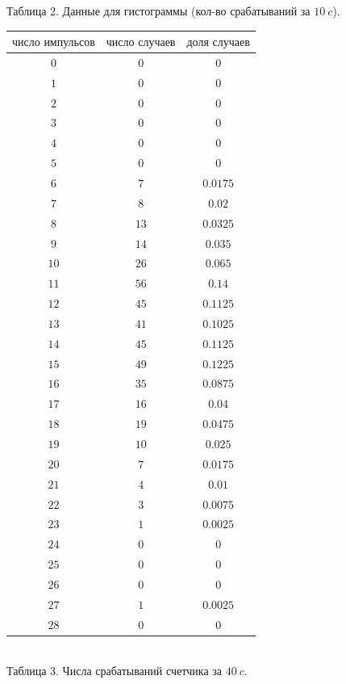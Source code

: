 \documentclass[a4paper,12pt]{article} %
\begin{document}
Таблица 2. Данные для гистограммы (кол-во срабатываний за $10\ c$).

\begin{tabular}{ | c | c | c |}
\hline
$\textbf{число импульсов}$ & $\textbf{число случаев}$ & $\textbf{доля случаев}$\\ \hline
$0$ & $0$ & $0$\\ \hline
$1$ & $0$ & $0$\\ \hline
$2$ & $0$ & $0$\\ \hline
$3$ & $0$ & $0$\\ \hline
$4$ & $0$ & $0$\\ \hline
$5$ & $0$ & $0$\\ \hline
$6$ & $7$ & $0.0175$\\ \hline
$7$ & $8$ & $0.02$\\ \hline
$8$ & $13$ & $0.0325$\\ \hline
$9$ & $14$ & $0.035$\\ \hline
$10$ & $26$ & $0.065$\\ \hline
$11$ & $56$ & $0.14$\\ \hline
$12$ & $45$ & $0.1125$\\ \hline
$13$ & $41$ & $0.1025$\\ \hline
$14$ & $45$ & $0.1125$\\ \hline
$15$ & $49$ & $0.1225$\\ \hline
$16$ & $35$ & $0.0875$\\ \hline
$17$ & $16$ & $0.04$\\ \hline
$18$ & $19$ & $0.0475$\\ \hline
$19$ & $10$ & $0.025$\\ \hline
$20$ & $7$ & $0.0175$\\ \hline
$21$ & $4$ & $0.01$\\ \hline
$22$ & $3$ & $0.0075$\\ \hline
$23$ & $1$ & $0.0025$\\ \hline
$24$ & $0$ & $0$\\ \hline
$25$ & $0$ & $0$\\ \hline
$26$ & $0$ & $0$\\ \hline
$27$ & $1$ & $0.0025$\\ \hline
$28$ & $0$ & $0$\\
\hline 
\end{tabular}\\

\newpage
Таблица 3. Числа срабатываний счетчика за $40\ c$.
\end{document}
